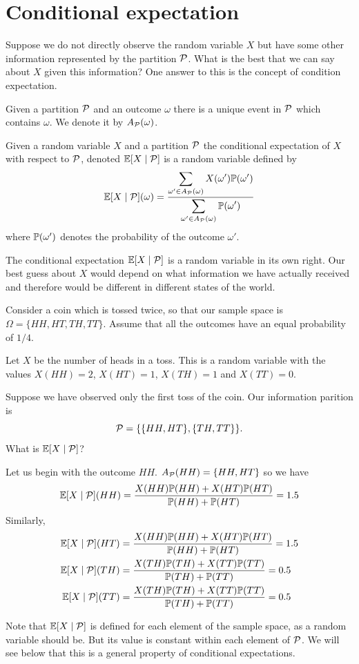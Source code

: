 \documentclass[11pt,reqno,openany]{amsbook}
\begin{document}
\section{Conditional expectation}
Suppose we do not directly observe the random variable $X$
but have some other information represented by the partition
$\setset{P}$. What is the best that we can say about $X$
given this information? One answer to this is the concept of
condition expectation.

Given a partition $\setset{P}$ and an outcome $\omega$ there
is a unique event in $\setset{P}$ which contains
$\omega$. We denote it by $A_{\setset{P}}(\omega)$.

\begin{defn}\label{def:conex}
  Given a random variable $X$ and a partition $\setset{P}$
  the conditional expectation of $X$ with respect to
  $\setset{P}$, denoted $\E[X\mid\setset{P}]$ is a random
  variable defined by
  \[\E[X\mid\setset{P}](\omega) 
  = \frac{\displaystyle \sum_{\omega' \in A_{\setset{P}}(\omega)} X(\omega')\P(\omega')}
  {\displaystyle\sum_{\omega' \in A_{\setset{P}}(\omega)} \P(\omega')}\]
  where $\P(\omega')$ denotes the probability of the outcome
  $\omega'$. 
\end{defn}

The conditional expectation $\E[X \mid \setset{P}]$ is a
random variable in its own right. Our best guess about $X$
would depend on what information we have actually received
and therefore would be different in different states of the
world.

\begin{exmp}
  Consider a coin which is tossed twice, so that our sample
  space is $\Omega=\{HH,HT,TH,TT\}$. Assume that all the
  outcomes have an equal probability of $1/4$.

  Let $X$ be the number
  of heads in a toss. This is a random variable with the
  values $X(HH)=2$, $X(HT)=1$, $X(TH)=1$ and $X(TT)=0$. 

  Suppose we have observed only the first toss of the
  coin. Our information parition is
  \[\setset{P}=\{\{HH,HT\},\{TH,TT\}\}.\]
  What is $\E[X \mid \setset{P}]$?

  Let us begin with the outcome
  $HH$. $A_{\setset{P}}(HH)=\{HH,HT\}$ so we have
  \[\E[X\mid\setset{P}](HH) 
  = \frac{X(HH)\P(HH)+X(HT)\P(HT)}
  {\P(HH)+\P(HT)}=1.5\]
  Similarly,
  \begin{align*}
    \E[X\mid\setset{P}](HT) 
    &= \frac{X(HH)\P(HH)+X(HT)\P(HT)}
    {\P(HH)+\P(HT)}=1.5\\
    \E[X\mid\setset{P}](TH) 
    & = \frac{X(TH)\P(TH)+X(TT)\P(TT)}
    {\P(TH)+\P(TT)}=0.5\\
    \E[X\mid\setset{P}](TT) 
    &= \frac{X(TH)\P(TH)+X(TT)\P(TT)}
    {\P(TH)+\P(TT)}=0.5
  \end{align*}

  Note that $\E[X \mid \setset{P}]$ is defined for each
  element of the sample space, as a random variable should
  be. But its value is constant within each element of
  $\setset{P}$. We will see below that this is a general
  property of conditional expectations.
\end{exmp}
\end{document}
